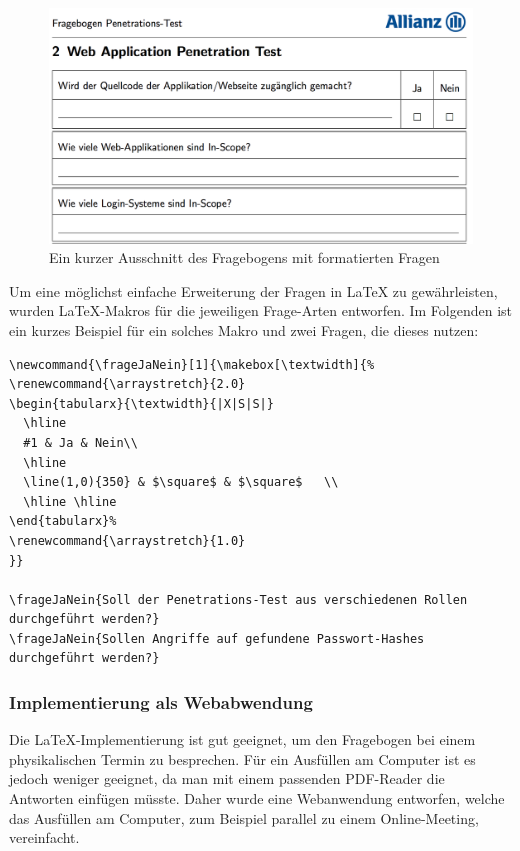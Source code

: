 \begin{figure}[htbp]
	\centering
	\includegraphics[width=\textwidth]{bilder/pentest_prozesse/vorbereitung/fragebogen_latex.png}
	\caption{Ein kurzer Ausschnitt des Fragebogens mit formatierten Fragen}
	\label{fig:FragLatex}
\end{figure}

Um eine möglichst einfache Erweiterung der Fragen in LaTeX zu gewährleisten, wurden LaTeX-Makros für die jeweiligen Frage-Arten entworfen. Im Folgenden ist ein kurzes Beispiel für ein solches Makro und zwei Fragen, die dieses nutzen:

\lstset{language=Tex}
\begin{lstlisting}
\newcommand{\frageJaNein}[1]{\makebox[\textwidth]{%
\renewcommand{\arraystretch}{2.0}
\begin{tabularx}{\textwidth}{|X|S|S|}
  \hline
  #1 & Ja & Nein\\
  \hline
  \line(1,0){350} & $\square$ & $\square$	\\
  \hline \hline
\end{tabularx}%
\renewcommand{\arraystretch}{1.0}
}}

\frageJaNein{Soll der Penetrations-Test aus verschiedenen Rollen durchgeführt werden?}
\frageJaNein{Sollen Angriffe auf gefundene Passwort-Hashes durchgeführt werden?}
\end{lstlisting}

\subsubsection{Implementierung als Webabwendung}\label{ref:AufImplInWeb}
Die LaTeX-Implementierung ist gut geeignet, um den Fragebogen bei einem physikalischen Termin zu besprechen. Für ein Ausfüllen am Computer ist es jedoch weniger geeignet, da man mit einem passenden PDF-Reader die Antworten einfügen müsste. Daher wurde eine Webanwendung entworfen, welche das Ausfüllen am Computer, zum Beispiel parallel zu einem Online-Meeting, vereinfacht.\\

